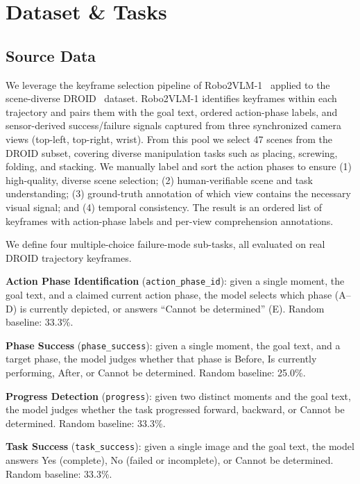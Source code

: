 \section{Dataset \& Tasks}
\label{sec:dataset}

\subsection{Source Data}
We leverage the keyframe selection pipeline of Robo2VLM-1~\cite{chen2025robo2vlm} applied to the scene-diverse DROID~\cite{khazatsky2024droid} dataset.
Robo2VLM-1 identifies keyframes within each trajectory and pairs them with the goal text,
ordered action-phase labels, and sensor-derived success/failure signals captured from three
synchronized camera views (top-left, top-right, wrist). From this pool we select 47 scenes
from the DROID subset, covering diverse manipulation tasks such as placing, screwing, folding, and stacking. We manually label and sort the action phases to ensure (1) high-quality, diverse scene selection; (2) human-verifiable scene and task understanding; (3) ground-truth annotation of which view contains the necessary visual signal; and (4) temporal consistency.
The result is an ordered list of keyframes with action-phase labels and per-view comprehension annotations.

We define four multiple-choice failure-mode sub-tasks, all evaluated on real DROID trajectory keyframes.

\textbf{Action Phase Identification} (\texttt{action\_phase\_id}): given a single moment, the goal text, and a claimed current action phase, the model selects which phase (A--D) is currently depicted, or answers ``Cannot be determined'' (E). Random baseline: 33.3\%. 

\textbf{Phase Success} (\texttt{phase\_success}): given a single moment, the goal text, and
a target phase, the model judges whether that phase is Before, Is currently performing,
After, or Cannot be determined. Random baseline: 25.0\%. 

\textbf{Progress Detection} (\texttt{progress}): given two distinct moments and the
goal text, the model judges whether the task progressed forward, backward, or
Cannot be determined. Random baseline: 33.3\%.

\textbf{Task Success} (\texttt{task\_success}): given a single image and the goal text,
the model answers Yes (complete), No (failed or incomplete), or Cannot be determined.
Random baseline: 33.3\%.

